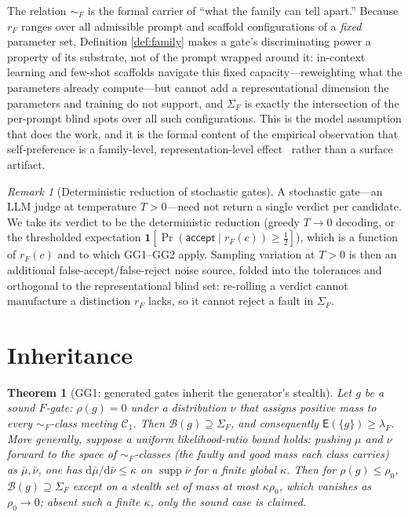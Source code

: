 \documentclass[11pt]{article}
\newtheorem{theorem}{Theorem}
\theoremstyle{definition}
\theoremstyle{remark}
\newtheorem{remark}{Remark}
\newcommand{\C}{\mathcal{C}}
\newcommand{\Cgood}{\C_{1}}
\newcommand{\simF}{\sim_{F}}
\newcommand{\SigF}{\Sigma_{F}}
\newcommand{\lF}{\lambda_{F}}
\newcommand{\B}{\mathcal{B}}
\newcommand{\E}{\mathsf{E}}
\begin{document}
The relation $\simF$ is the formal carrier of ``what the family can tell apart.'' Because $r_F$ ranges
over all admissible prompt and scaffold configurations of a \emph{fixed} parameter set, Definition
\ref{def:family} makes a gate's discriminating power a property of its substrate, not of the prompt
wrapped around it: in-context learning and few-shot scaffolds navigate this fixed capacity---reweighting
what the parameters already compute---but cannot add a representational dimension the parameters and
training do not support, and $\SigF$ is exactly the intersection of the per-prompt blind spots over all
such configurations. This is the model assumption that does the work, and it is
the formal content of the empirical observation that self-preference is a family-level,
representation-level effect~\cite{spiliopoulou2025,panickssery2024} rather than a surface artifact.

\begin{remark}[Deterministic reduction of stochastic gates]
A stochastic gate---an LLM judge at temperature $T>0$---need not return a single verdict per candidate.
We take its verdict to be the deterministic reduction (greedy $T\to0$ decoding, or the thresholded
expectation $\mathbf{1}[\Pr(\textsf{accept}\mid r_F(c))\ge\tfrac12]$), which is a function of $r_F(c)$
and to which GG1--GG2 apply. Sampling variation at $T>0$ is then an additional false-accept/false-reject
noise source, folded into the tolerances and orthogonal to the representational blind set: re-rolling a
verdict cannot manufacture a distinction $r_F$ lacks, so it cannot reject a fault in $\SigF$.
\end{remark}

\section{Inheritance}\label{sec:gg1}

\begin{theorem}[GG1: generated gates inherit the generator's stealth]\label{thm:gg1}
Let $g$ be a \emph{sound} $F$-gate: $\rho(g)=0$ under a distribution $\nu$ that assigns positive mass
to every $\simF$-class meeting $\Cgood$. Then $\B(g)\supseteq\SigF$, and consequently
$\E(\{g\})\ge\lF$. More generally, suppose a \emph{uniform likelihood-ratio bound} holds: pushing
$\mu$ and $\nu$ forward to the space of $\simF$-classes (the faulty and good mass each class carries)
as $\bar\mu,\bar\nu$, one has $\mathrm{d}\bar\mu/\mathrm{d}\bar\nu\le\kappa$ on $\operatorname{supp}\bar\nu$
for a finite global $\kappa$. Then for $\rho(g)\le\rho_0$, $\B(g)\supseteq\SigF$ except on a stealth set
of mass at most $\kappa\rho_0$, which vanishes as $\rho_0\to 0$; absent such a finite $\kappa$, only the
sound case is claimed.
\end{theorem}
\end{document}
